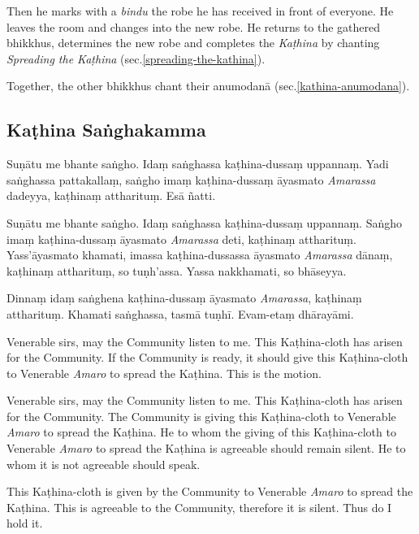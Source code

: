 Then he marks with a \emph{bindu} the robe he has received in front of everyone. He leaves the room and changes into the new robe. He returns to the
gathered bhikkhus, determines the new robe and completes the \emph{Kaṭhina} by
chanting \emph{Spreading the Kaṭhina} (sec.\ref{spreading-the-kathina}).

Together, the other bhikkhus chant their anumodanā (sec.\ref{kathina-anumodana}).

\subsection{Kaṭhina Saṅghakamma}
\label{kathina-sanghakamma}


Suṇātu me bhante saṅgho. Idaṃ saṅghassa kaṭhina-dussaṃ uppannaṃ. Yadi saṅghassa
pattakallaṃ, saṅgho imaṃ kaṭhina-dussaṃ āyasmato \emph{Amarassa} dadeyya,
kaṭhinaṃ attharituṃ. Esā ñatti.

Suṇātu me bhante saṅgho. Idaṃ saṅghassa kaṭhina-dussaṃ uppannaṃ. Saṅgho imaṃ
kaṭhina-dussaṃ āyasmato \emph{Amarassa} deti, kaṭhinaṃ attharituṃ.
Yass'āyasmato khamati, imassa kaṭhina-dussassa āyasmato \emph{Amarassa} dānaṃ,
kaṭhinaṃ attharituṃ, so tuṇh'assa. Yassa nakkhamati, so bhāseyya.

Dinnaṃ idaṃ saṅghena kaṭhina-dussaṃ āyasmato \emph{Amarassa}, kaṭhinaṃ
attharituṃ. Khamati saṅghassa, tasmā tuṇhī. Evam-etaṃ dhārayāmi.


\begin{english}

Venerable sirs, may the Community listen to me. This Kaṭhina-cloth has arisen
for the Community. If the Community is ready, it should give this Kaṭhina-cloth
to Venerable \emph{Amaro} to spread the Kaṭhina. This is the motion.

Venerable sirs, may the Community listen to me. This Kaṭhina-cloth has arisen
for the Community. The Community is giving this Kaṭhina-cloth to Venerable
\emph{Amaro} to spread the Kaṭhina. He to whom the giving of this Kaṭhina-cloth
to Venerable \emph{Amaro} to spread the Kaṭhina is agreeable should remain
silent. He to whom it is not agreeable should speak.

This Kaṭhina-cloth is given by the Community to Venerable \emph{Amaro} to
spread the Kaṭhina. This is agreeable to the Community, therefore it is silent.
Thus do I hold it.

\end{english}

